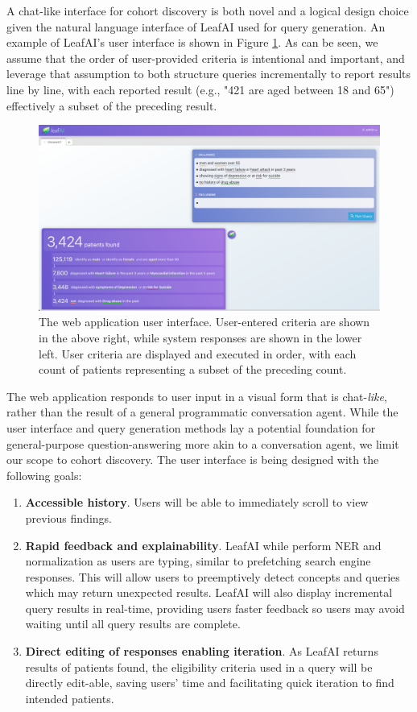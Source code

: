 \documentclass[../main.tex]{subfiles}
\begin{document}
A chat-like interface for cohort discovery is both novel and a logical design choice given the natural language interface of LeafAI used for query generation. An example of LeafAI's user interface is shown in Figure \ref{fig_leafai_demo}. As can be seen, we assume that the order of user-provided criteria is intentional and important, and leverage that assumption to both structure queries incrementally to report results line by line, with each reported result (e.g., "421 are aged between 18 and 65") effectively a subset of the preceding result.

\begin{figure}[h!]
  \includegraphics[scale=0.28]{Figures/8_web_application/leafai_demo.png}  
  \caption{The web application user interface. User-entered criteria are shown in the above right, while system responses are shown in the lower left. User criteria are displayed and executed in order, with each count of patients representing a subset of the preceding count.}
\label{fig_leafai_demo}
\end{figure}

The web application responds to user input in a visual form that is chat-\textit{like}, rather than the result of a general programmatic conversation agent. While the user interface and query generation methods lay a potential foundation for general-purpose question-answering more akin to a conversation agent, we limit our scope to cohort discovery. The user interface is being designed with the following goals:

\begin{enumerate}
    \item \textbf{Accessible history}. Users will be able to immediately scroll to view previous findings.
    \item \textbf{Rapid feedback and explainability}. LeafAI while perform NER and normalization as users are typing, similar to prefetching search engine responses. This will allow users to preemptively detect concepts and queries which may return unexpected results. LeafAI will also display incremental query results in real-time, providing users faster feedback so users may avoid waiting until all query results are complete.
    \item \textbf{Direct editing of responses enabling iteration}. As LeafAI returns results of patients found, the eligibility criteria used in a query will be directly edit-able, saving users' time and facilitating quick iteration to find intended patients.
\end{enumerate}
\end{document}
